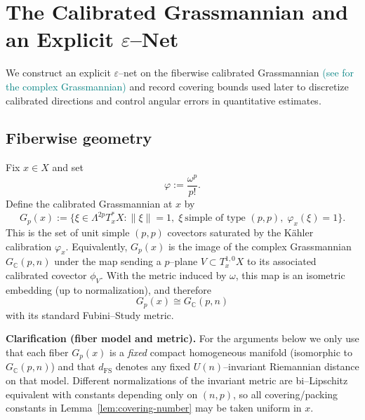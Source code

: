 \documentclass[11pt]{article}
\newcommand{\REVMZ}[1]{\textcolor{teal}{#1}}  %
\numberwithin{equation}{section}  %
\theoremstyle{plain}
\theoremstyle{definition}
\theoremstyle{remark}
\newcommand{\C}{\mathbb{C}}
\begin{document}

\section{The Calibrated Grassmannian and an Explicit \texorpdfstring{$\varepsilon$}{epsilon}--Net}




We construct an explicit $\varepsilon$--net on the fiberwise calibrated Grassmannian \REVMZ{(see \cite{GH78} for the complex Grassmannian)} and record covering bounds used later to discretize calibrated directions and control angular errors in quantitative estimates.



\subsection*{Fiberwise geometry}

Fix $x\in X$ and set
\[
\varphi := \frac{\omega^{p}}{p!}.
\]
Define the calibrated Grassmannian at $x$ by
\[
G_{p}(x)
:=
\Big\{
\xi \in \Lambda^{2p}T^{*}_{x}X :
\|\xi\| = 1,\;
\xi\ \text{simple of type $(p,p)$},\;
\varphi_{x}(\xi)=1
\Big\}.
\]
This is the set of unit simple $(p,p)$ covectors saturated by the K\"ahler
calibration $\varphi_{x}$.  Equivalently, $G_{p}(x)$ is the image of the
complex Grassmannian $G_{\C}(p,n)$ under the map sending a $p$--plane
$V\subset T^{1,0}_{x}X$ to its associated calibrated covector $\phi_{V}$.
With the metric induced by $\omega$, this map is an isometric embedding
(up to normalization), and therefore
\[
G_{p}(x) \cong G_{\C}(p,n)
\]
with its standard Fubini--Study metric.


\noindent\textbf{Clarification (fiber model and metric).}
For the arguments below we only use that each fiber $G_{p}(x)$ is a \emph{fixed} compact homogeneous manifold
(isomorphic to $G_{\C}(p,n)$) and that $d_{\mathrm{FS}}$ denotes any fixed $U(n)$--invariant Riemannian distance on that model.
Different normalizations of the invariant metric are bi--Lipschitz equivalent with constants depending only on $(n,p)$,
so all covering/packing constants in Lemma~\ref{lem:covering-number} may be taken uniform in $x$.
\end{document}
